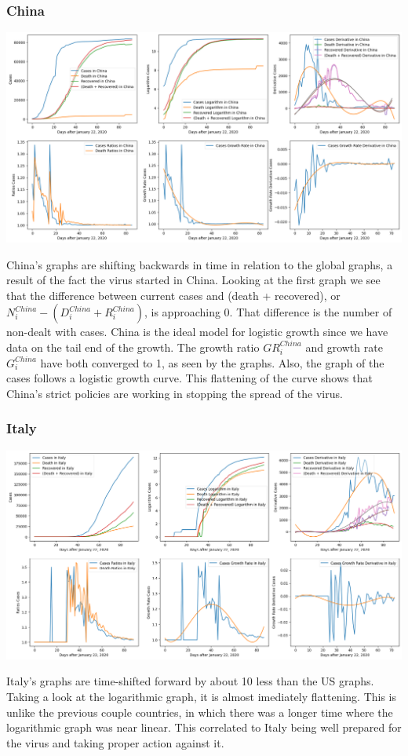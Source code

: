 \documentclass{report}
\begin{document}
            \subsubsection{China}
                \begin{center}
                    \includegraphics[width=\textwidth]{plots/china/analyze.png}
                \end{center}
                China's graphs are shifting backwards in time in relation to the global graphs, a result of the fact the virus started in China. Looking at the first graph we see that the difference between current cases and (death + recovered), or $N^{China}_i - (D^{China}_i + R^{China}_i)$, is approaching 0. That difference is the number of non-dealt with cases. China is the ideal model for logistic growth since we have data on the tail end of the growth. The growth ratio $GR^{China}_i$ and growth rate $G^{China}_i$ have both converged to 1, as seen by the graphs. Also, the graph of the cases follows a logistic growth curve. This flattening of the curve shows that China's strict policies are working in stopping the spread of the virus.
            \subsubsection{Italy}
                \begin{center}
                    \includegraphics[width=\textwidth]{plots/italy/analyze.png}
                \end{center}
                Italy's graphs are time-shifted forward by about 10 less than the US graphs. Taking a look at the logarithmic graph, it is almost imediately flattening. This is unlike the previous couple countries, in which there was a longer time where the logarithmic graph was near linear. This correlated to Italy being well prepared for the virus and taking proper action against it.
\end{document}
